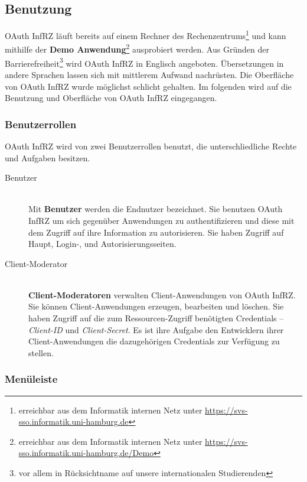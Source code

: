 \documentclass[12pt,a4paper,pointednumbers,abstracton]{scrartcl}
\begin{document}
\subsection{Benutzung}
\label{sec:oauth-infrz/usage}

OAuth InfRZ läuft bereits auf einem Rechner des Rechenzentrums\footnote{erreichbar aus dem Informatik internen Netz unter \url{https://svs-sso.informatik.uni-hamburg.de}} und kann mithilfe der \textbf{Demo Anwendung}\footnote{erreichbar aus dem Informatik internen Netz unter \url{https://svs-sso.informatik.uni-hamburg.de/Demo}} ausprobiert werden.
Aus Gründen der Barrierefreiheit\footnote{vor allem in Rücksichtname auf unsere internationalen Studierenden} wird OAuth InfRZ in Englisch angeboten.
Übersetzungen in andere Sprachen lassen sich mit mittlerem Aufwand nachrüsten.
Die Oberfläche von OAuth InfRZ wurde möglichst schlicht gehalten.
Im folgenden wird auf die Benutzung und Oberfläche von OAuth InfRZ eingegangen.

\subsubsection{Benutzerrollen}

OAuth InfRZ wird von zwei Benutzerrollen benutzt, die unterschliedliche Rechte und Aufgaben besitzen.

\begin{description}
	\item[Benutzer] \hfill \\
		Mit \textbf{Benutzer} werden die Endnutzer bezeichnet.
		Sie benutzen OAuth InfRZ um sich gegenüber Anwendungen zu authentifizieren und diese mit dem Zugriff auf ihre Information zu autorisieren. 
		Sie haben Zugriff auf Haupt, Login-, und Autorisierungsseiten.
	\item[Client-Moderator] \hfill \\
		\textbf{Client-Moderatoren} verwalten Client-Anwendungen von OAuth InfRZ.
		Sie können Client-Anwendungen erzeugen, bearbeiten und löschen.
		Sie haben Zugriff auf die zum Ressourcen-Zugriff benötigten Credentials -- \emph{Client-ID} und \emph{Client-Secret}.
		Es ist ihre Aufgabe den Entwicklern ihrer Client-Anwendungen die dazugehörigen Credentials zur Verfügung zu stellen.
\end{description}

\subsubsection{Menüleiste}
\end{document}
